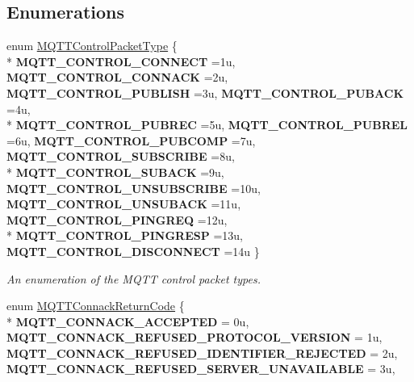 \subsection*{Enumerations}
\begin{DoxyCompactItemize}
\item 
enum \hyperlink{group__unpackers_gacbd36b88ec7f62bc161b07e1a0aed679}{M\+Q\+T\+T\+Control\+Packet\+Type} \{ \\*
{\bfseries M\+Q\+T\+T\+\_\+\+C\+O\+N\+T\+R\+O\+L\+\_\+\+C\+O\+N\+N\+E\+CT} =1u, 
{\bfseries M\+Q\+T\+T\+\_\+\+C\+O\+N\+T\+R\+O\+L\+\_\+\+C\+O\+N\+N\+A\+CK} =2u, 
{\bfseries M\+Q\+T\+T\+\_\+\+C\+O\+N\+T\+R\+O\+L\+\_\+\+P\+U\+B\+L\+I\+SH} =3u, 
{\bfseries M\+Q\+T\+T\+\_\+\+C\+O\+N\+T\+R\+O\+L\+\_\+\+P\+U\+B\+A\+CK} =4u, 
\\*
{\bfseries M\+Q\+T\+T\+\_\+\+C\+O\+N\+T\+R\+O\+L\+\_\+\+P\+U\+B\+R\+EC} =5u, 
{\bfseries M\+Q\+T\+T\+\_\+\+C\+O\+N\+T\+R\+O\+L\+\_\+\+P\+U\+B\+R\+EL} =6u, 
{\bfseries M\+Q\+T\+T\+\_\+\+C\+O\+N\+T\+R\+O\+L\+\_\+\+P\+U\+B\+C\+O\+MP} =7u, 
{\bfseries M\+Q\+T\+T\+\_\+\+C\+O\+N\+T\+R\+O\+L\+\_\+\+S\+U\+B\+S\+C\+R\+I\+BE} =8u, 
\\*
{\bfseries M\+Q\+T\+T\+\_\+\+C\+O\+N\+T\+R\+O\+L\+\_\+\+S\+U\+B\+A\+CK} =9u, 
{\bfseries M\+Q\+T\+T\+\_\+\+C\+O\+N\+T\+R\+O\+L\+\_\+\+U\+N\+S\+U\+B\+S\+C\+R\+I\+BE} =10u, 
{\bfseries M\+Q\+T\+T\+\_\+\+C\+O\+N\+T\+R\+O\+L\+\_\+\+U\+N\+S\+U\+B\+A\+CK} =11u, 
{\bfseries M\+Q\+T\+T\+\_\+\+C\+O\+N\+T\+R\+O\+L\+\_\+\+P\+I\+N\+G\+R\+EQ} =12u, 
\\*
{\bfseries M\+Q\+T\+T\+\_\+\+C\+O\+N\+T\+R\+O\+L\+\_\+\+P\+I\+N\+G\+R\+E\+SP} =13u, 
{\bfseries M\+Q\+T\+T\+\_\+\+C\+O\+N\+T\+R\+O\+L\+\_\+\+D\+I\+S\+C\+O\+N\+N\+E\+CT} =14u
 \}\begin{DoxyCompactList}\small\item\em An enumeration of the M\+Q\+TT control packet types. \end{DoxyCompactList}
\item 
enum \hyperlink{group__unpackers_ga07e480dfa5738e60c54ad0447ddb1a25}{M\+Q\+T\+T\+Connack\+Return\+Code} \{ \\*
{\bfseries M\+Q\+T\+T\+\_\+\+C\+O\+N\+N\+A\+C\+K\+\_\+\+A\+C\+C\+E\+P\+T\+ED} = 0u, 
{\bfseries M\+Q\+T\+T\+\_\+\+C\+O\+N\+N\+A\+C\+K\+\_\+\+R\+E\+F\+U\+S\+E\+D\+\_\+\+P\+R\+O\+T\+O\+C\+O\+L\+\_\+\+V\+E\+R\+S\+I\+ON} = 1u, 
{\bfseries M\+Q\+T\+T\+\_\+\+C\+O\+N\+N\+A\+C\+K\+\_\+\+R\+E\+F\+U\+S\+E\+D\+\_\+\+I\+D\+E\+N\+T\+I\+F\+I\+E\+R\+\_\+\+R\+E\+J\+E\+C\+T\+ED} = 2u, 
{\bfseries M\+Q\+T\+T\+\_\+\+C\+O\+N\+N\+A\+C\+K\+\_\+\+R\+E\+F\+U\+S\+E\+D\+\_\+\+S\+E\+R\+V\+E\+R\+\_\+\+U\+N\+A\+V\+A\+I\+L\+A\+B\+LE} = 3u, 

\end{DoxyCompactItemize}
